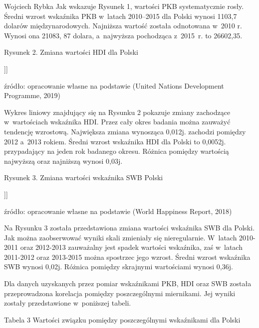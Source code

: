 \begin{artplenv}{Wojciech Rybka}
Jak wskazuje Rysunek 1, wartości PKB systematycznie rosły. Średni wzrost wskaźnika PKB w~latach 2010–2015 dla Polski
wynosi 1103,7 dolarów międzynarodowych. Najniższa wartość została odnotowana w~2010 r. Wynosi ona 21083, 87 dolara,
a~najwyższa pochodząca z~2015~r. to 26602,35. 

{\centering
Rysunek 2. Zmiana wartości HDI dla Polski
\par}

{\centering
[[[rysunek\_2]]]
\par}

źródło: opracowanie własne na podstawie \label{ref:RNDSuSEh9knxi}(United Nations Development Programme, 2019)

Wykres liniowy znajdujący się na Rysunku 2 pokazuje zmiany zachodzące w~wartościach wskaźnika HDI. Przez cały okres
badania można zauważyć tendencję wzrostową. Największa zmiana wynosząca 0,012j. zachodzi pomiędzy 2012 a~2013 rokiem.
Średni wzrost wskaźnika HDI dla Polski to 0,0052j. przypadający na jeden rok badanego okresu. Różnica pomiędzy
wartością najwyższą oraz najniższą wynosi 0,03j.

{\centering
Rysunek 3. Zmiana wartości wskaźnika SWB Polski
\par}

{\centering
[[[rysunek\_3]]]
\par}

źródło: opracowanie własne na podstawie \label{ref:RNDWHAJqDwCvX}(World Happiness Report, 2018)

Na Rysunku 3 została przedstawiona zmiana wartości wskaźnika SWB dla Polski. Jak można zaobserwować wyniki skali
zmieniały się nieregularnie. W~latach 2010-2011 oraz 2012-2013 zauważalny jest spadek wartości wskaźnika, zaś w~latach
2011-2012 oraz 2013-2015 można spostrzec jego wzrost. Średni wzrost wskaźnika SWB wynosi 0,02j. Różnica pomiędzy
skrajnymi wartościami wynosi 0,36j.

Dla danych uzyskanych przez pomiar wskaźnikami PKB, HDI oraz SWB została przeprowadzona korelacja pomiędzy
poszczególnymi miernikami. Jej wyniki zostały przedstawione w~poniższej tabeli. 

{\centering
Tabela 3 Wartości związku pomiędzy poszczególnymi wskaźnikami dla Polski
\par}


\end{artplenv}
